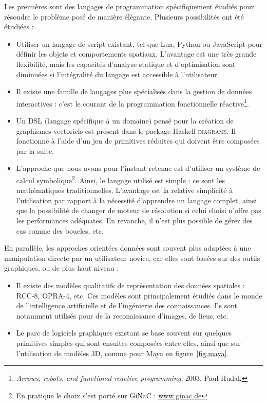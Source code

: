 \documentclass[french,12pt]{article}
\begin{document}
Les premières sont des langages de programmation spécifiquement étudiés pour résoudre le problème posé de manière élégante. Plusieurs possibilités ont été étudiées : 
\begin{itemize}
\item Utiliser un langage de script existant, tel que Lua, Python ou JavaScript pour définir les objets et comportements spatiaux. L'avantage est une très grande flexibilité, mais les capacités d'analyse statique et d'optimisation sont diminuées si l'intégralité du langage est accessible à l'utilisateur.
\item Il existe une famille de langages plus spécialisés dans la gestion de données interactives : c'est le courant de la programmation fonctionnelle réactive\footnote{\textit{Arrows, robots, and functional reactive programming}, 2003, Paul Hudak}.
\item Un DSL (langage spécifique à un domaine) pensé pour la création de graphismes vectoriels est présent dans le package Haskell \textsc{diagrams}. Il fonctionne à l'aide d'un jeu de primitives réduites qui doivent être composées par la suite.
\item L'approche que nous avons pour l'instant retenue est d'utiliser un système de calcul symbolique\footnote{En pratique le choix s'est porté sur GiNaC : \url{www.ginac.de}}. Ainsi, le langage utilisé est simple : ce sont les mathématiques traditionnelles. L'avantage est la relative simplicité à l'utilisation par rapport à la nécessité d'apprendre un langage complet, ainsi que la possibilité de changer de moteur de résolution si celui choisi n'offre pas les performances adéquates.
En revanche, il n'est plus possible de gérer des cas comme des boucles, etc.
\end{itemize}

En parallèle, les approches orientées données sont souvent plus adaptées à une manipulation directe par un utilisateur novice, car elles sont basées sur des outils graphiques, ou de plus haut niveau : 
\begin{itemize}
\item Il existe des modèles qualitatifs de représentation des données spatiales : RCC-8, OPRA-4, etc. Ces modèles sont principalement étudiés dans le monde de l'intelligence artificielle et de l'ingénierie des connaissances. Ils sont notamment utilisés pour de la reconaissance d'images, de lieus, etc.
\item Le parc de logiciels graphiques existant se base souvent sur quelques primitives simples qui sont ensuites composées entre elles, ainsi que sur l'utilisation de modèles 3D, comme pour Maya en figure~\ref{fig.maya}.
\end{itemize}
\end{document}
